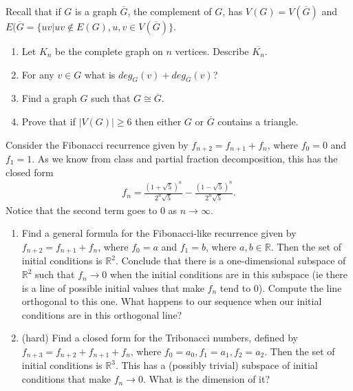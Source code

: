 \begin{enumerate}
    
    \newpage
     Recall that if $G$ is a graph $\overline{G}$, the complement of $G$, has $V(G)=V(\overline{G})$ and $E(\overline{G}=\{uv| uv\notin E(G), u,v\in V(\overline{G})\}$.
    \begin{enumerate}
        \item Let $K_n$ be the complete graph on $n$ vertices. Describe $\overline{K_n}$.
        \item For any $v\in G$ what is $deg_G(v)+deg_{\overline{G}}(v)$?
        \item Find a graph $G$ such that $G\cong\overline{G}$. 
        \item Prove that if $|V(G)|\geq 6$ then either $G$ or $\overline{G}$ contains a triangle.
    \end{enumerate}

    
    Consider the Fibonacci recurrence given by $f_{n+2} = f_{n+1} + f_n$, where $f_0 = 0$ and $f_1 = 1$. As we know from class and partial fraction decomposition, this has the closed form
    \begin{align*}
        f_n = \frac{(1+\sqrt{5})^n}{2^n \sqrt{5}} -  \frac{(1-\sqrt{5})^n}{2^n \sqrt{5}}.
    \end{align*}
    Notice that the second term goes to $0$ as $n \to \infty$.
    \begin{enumerate}
        \item Find a general formula for the Fibonacci-like recurrence given by $f_{n+2} = f_{n+1} + f_n$, where $f_0 = a$ and $f_1 = b$, where $a,b \in \mathbb{R}$. Then the set of initial conditions is $\mathbb{R}^2$. Conclude that there is a one-dimensional subspace of $\mathbb{R}^2$ such that $f_n \to 0$ when the initial conditions are in this subspace (ie there is a line of possible initial values that make $f_n$ tend to $0$). Compute the line orthogonal to this one. What happens to our sequence when our initial conditions are in this orthogonal line?
        \item (hard) Find a closed form for the Tribonacci numbers, defined by $f_{n+3} = f_{n+2} + f_{n+1} + f_n$, where $f_0 = a_0 , f_1 = a_1 , f_2 = a_2$. Then the set of initial conditions is $\mathbb{R}^3$. This has a (possibly trivial) subspace of initial conditions that make $f_n \to 0$. What is the dimension of it?
    \end{enumerate}
\end{enumerate}